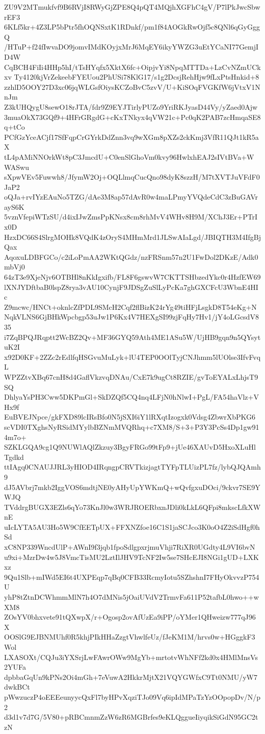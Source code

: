 ZU9V2MTmukfvf9B6RVjI8RWyGjZPE8Q4pQT4MQjhXGFhC4gV/P7lPkJwcSbwrEF3
6KLf5kr+4Z3LP5bPtr5fhOQNSxtK1RDnkf/pm1f84AOGkRwOjf5c8QNl6qGyGggQ
/HTuP+f24fIwvaDO9jomvIMdKOyjxMrJ6MqEY6ikyYWZG3uEtYCaNI77GemjID4W
CqBCH4FiIi4HHp5hI/tTsHYqfx5XktX6fc+OipjvYi8NpqMTTDa+LzCvNZmUCkxv
Ty4120kjVrZekeebFYEUou2PhUSi78KlG17/s1g2DcsjRehHjw9fLxPtsHnkid+8
zzhlD5OOY27D3xc06jqWLGsfOiysKCZoBvC5zvV/U+KiSOqFVGKfW6jVtxV1NnJm
Z3kUHQygU8sewO18rJTA/fdr9Z9EYJTirlyPUZo9YriRKJyasD44Vy/yZaed0Ajw
3muaOkX73GQf9+4HFrGRgdG+cKxTNkyx4qVW21c+Pc0qK2PAB7zcHmqaSE8q+tCo
PCfGzYceACjf17SfFqpCrGYrkDdZnn3vq9wXGm8pXZs2ckKmj3VfR11QJt1kR5aX
tL4pAMiNNOrkWt8pC3JmcdU+C0enSlGhoVm0kvy96HwlxhEAJ2sIVtBVa+WWASwu
sXpwVEv5Fuwwh8/JfymW2Oj+OQLlmqCucQno98dyK8szzH/M7tXVTJuVFdF0JaP2
oQJa+rvIYzEAuNo5TZG/dAe3M8ap57dAvR0w4maLPmyYVQdeCdC3zBuGAVrayS6K
5vznVfepiWTzSU/d4ixIJwZmsPpKNsx8cm8rhMvV4WHv8H9M/XChJ3Er+PTrIx0D
HzxDC66S4SlrgMOHk8VQdK4zOryS4MHmMrd1JLSwAIaLgd/JBIQTH3M4IfgBjQax
AqoxuLDBFGCo/c2iLoPmAA2WKtQGdz/nzFRSnm57n2U1FwDol2DKzE/Adk0mbVj0
64zT3e9XjeNjv6OTBHl8nKkIgxifb/FL8F6gswvW7CKTTSHbzedYkc0r4HzfEW69
lXNJYDftbaB0lspZ8rya3vAU10CynjF9JDSgZuSlLyPcKa7ghGXCFcU3WbnE4HIc
Z9mcwc/HNCt+oknlcZfPDL9SMcH2Cqf2flBizK24rYg49tiHFjLsgkD8T54eKg+N
NqkVLNS6GjBHkWpcbgp53uJw1P6Kx4V7HEXgSI99zjFqHy7Hv1/jY4oLGcsdV835
i7ZqBPQJRqptt2WcBZ2Qv+MF36GYQ59Ath4ME1ASu5W/UjHB9gqn9n5QYsytuK2I
x92D0KF+2ZZc2rEdlfqHSGvuMuLyk+lU4TEP0OOlTyjCNJhmm5lUOlse3IfvFvqL
WPZZtvXBq67cnH8d4GaflVkzvqDNAu/CxE7k9ugCt8RZIE/gvToEYALxLhjsT9SQ
DhlyaYsPH3Cww5DKPmGl+SkDZQf5CQ4nq4LFjN0hNlwI+PgL/FA54haVlz+VHx9f
EuBVEJNpce/gkFXD89lcIRsBfo0N5jSXI6iY1lRXqtIzogxk0Vdsg4ZbwrXbPKG6
scVDI0TXghsNyRSidMYylbBZNmMVQRhq+c7XM8/S+3+P3Y3PcSs4Dp1gw914m7o+
SZKLGQA9cg1Q9NUWlAQlZkzuy3BgyFRGo99tFp9+jUe46XAUvD5HxoXLuHlTgdkd
ttIAgq0CNAUJJRL3yHIOD4IRqngpCRVTkizjagtTYFpTLUizPL7fz/lybQJQAmh9
dJ5AVbrj7mkb2IggVOS6mdtjNE0yAHyUpYWKmQ+wQvfgxuDOci/9ckvr7SE9YWJQ
TVddrgBUGX3EZls6qYo73KnJl0w3WRJROERbxnJDli0kLkL6QFpi8mkscLfkXWnE
uIcLYTA5AU3Ho5W9CfEETpUX+FFXNZfoe16C1S1jaSCJco3K0oO4Z2iSdHgf0hSd
xC8NP339WncdUlP+AWnI9f3jqb1fpoSdlgpxrjmuVhji7RiXR0UGdty4L9VI6bvN
u9xi+MzrDw4w5J8VmcTisMU2LztIlJHV9TcNF2Iw5se7SHcEJI8NGi1gUD+LXKxz
9Qu1Slb+mIWd5EI6t4UXPEqp7qBq0CFB33RcmyIotu5SZhshnI7FHyOkvvzP754U
yhP8tZtnDCWhmmMlN7h4O7dMNis5jOaiUVdV2TrmvFa611P52tafbL0hwo++wXM8
ZOsYV0bhxvete91tQXwpX/r+Ogosp2ovAfUzEa9iPP/oYMer1QHweizw777qJ96X
OOSlG9EJBNMUhf0R5khjPIkHHaZzgtVhwlfeUz/fJeKM1M/hrvs0w+HGggkF3Wol
LXASOXt/CQJu3iYXSrjLwFAwrOWw9MgYb+mrtotvWhNFf2kd0x4HMlMnsVs2YUFa
dpbbaGqUn9kPNs2Oi4mGh+7eVuwA2HkkrMjtX21VQYGWfxC9Tt0NMU/yW7dwkBCt
pWwzuczP4oEEEeunyycQxFl7byHPvXqziTJo09Vq6ipIdMPaTzYzOOpopDv/N/p2
d3d1v7d7G/5V80+pRBCmnmZzW6zR6MGBrfes9eKLQggueIiyqikSiGdN95GC2tzN
